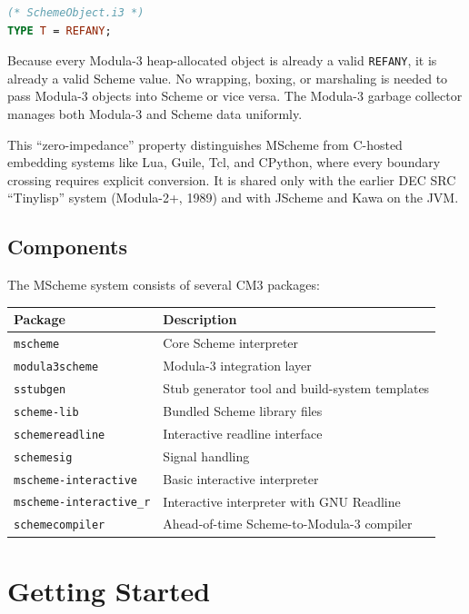 \documentclass[12pt]{report}
\begin{document}
\begin{lstlisting}[language=Modula3]
(* SchemeObject.i3 *)
TYPE T = REFANY;
\end{lstlisting}

Because every Modula-3 heap-allocated object is already a valid {\tt REFANY},
it is already a valid Scheme value.  No wrapping, boxing, or marshaling
is needed to pass Modula-3 objects into Scheme or vice versa.  The Modula-3
garbage collector manages both Modula-3 and Scheme data uniformly.

This ``zero-impedance'' property distinguishes MScheme from
C-hosted embedding systems like Lua, Guile, Tcl, and CPython, where
every boundary crossing requires explicit conversion.  It is shared
only with the earlier DEC SRC ``Tinylisp'' system (Modula-2+, 1989)
and with JScheme and Kawa on the JVM.

\section{Components}

The MScheme system consists of several CM3 packages:

\begin{center}
\begin{tabular}{ll}
\toprule
\textbf{Package} & \textbf{Description} \\
\midrule
{\tt mscheme}         & Core Scheme interpreter \\
{\tt modula3scheme}   & Modula-3 integration layer \\
{\tt sstubgen}        & Stub generator tool and build-system templates \\
{\tt scheme-lib}      & Bundled Scheme library files \\
{\tt schemereadline}  & Interactive readline interface \\
{\tt schemesig}       & Signal handling \\
{\tt mscheme-interactive}   & Basic interactive interpreter \\
{\tt mscheme-interactive\_r} & Interactive interpreter with GNU Readline \\
{\tt schemecompiler}  & Ahead-of-time Scheme-to-Modula-3 compiler \\
\bottomrule
\end{tabular}
\end{center}


\chapter{Getting Started}
\end{document}
